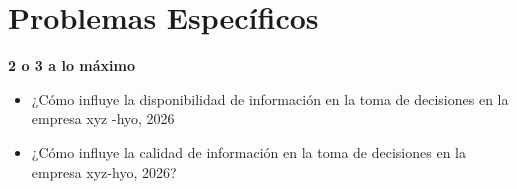 \section{Problemas Específicos}
    \begin{sectext}
        \textbf{2 o 3 a lo máximo}

        \begin{itemize}
            \item ¿Cómo influye la disponibilidad de  información en la toma de decisiones en la empresa xyz -hyo, 2026

            \item ¿Cómo influye la calidad de información en la toma de decisiones en la empresa xyz-hyo, 2026?
        \end{itemize}
    \end{sectext}